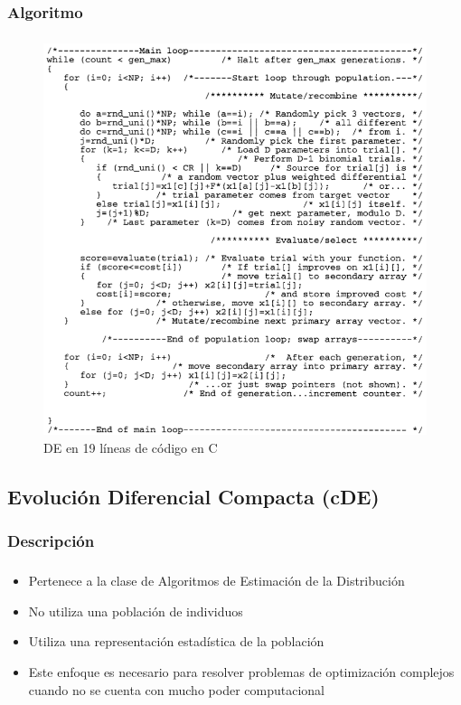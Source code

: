 \documentclass[serif]{beamer}
\begin{document}
\subsubsection{Algoritmo}
\begin{frame}
\frametitle{\insertsubsubsection}
	\vspace*{-0.2cm}
	\begin{figure}
	\centering
	\includegraphics[height=0.9\textheight]{de_algorithm.png}
	\caption{DE en 19 líneas de código en C}
	\end{figure}
\end{frame}

\subsection{Evolución Diferencial Compacta (cDE)}

\subsubsection{Descripción}
\begin{frame}
\frametitle{\insertsubsubsection}
	\begin{itemize}\setlength{\itemsep}{4mm}
		\item Pertenece a la clase de Algoritmos de Estimación de la Distribución
		\item No utiliza una población de individuos
		\item Utiliza una representación estadística de la población
		\item Este enfoque es necesario para resolver problemas de optimización complejos cuando no se cuenta con mucho poder computacional
	\end{itemize}
\end{frame}
\end{document}
